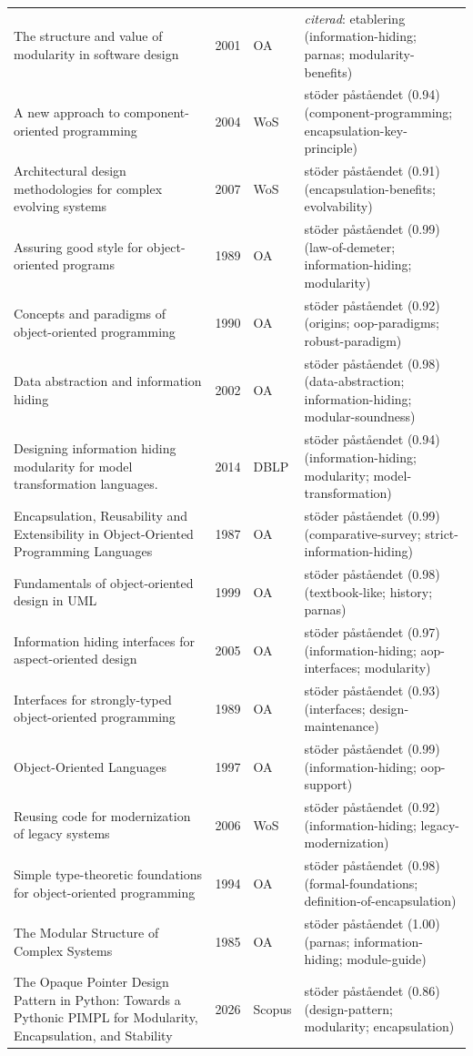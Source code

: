\begin{longtable}{@{}%
  >{\raggedright\arraybackslash}p{}c%
  >{\raggedright\arraybackslash}p{}%
  >{\raggedright\arraybackslash}p{}@{}}
The structure and value of modularity in software design & 2001 & OA & \emph{citerad}: etablering (information-hiding; parnas; modularity-benefits) \\
A new approach to component-oriented programming & 2004 & WoS & stöder påståendet (0.94) (component-programming; encapsulation-key-principle) \\
Architectural design methodologies for complex evolving systems & 2007 & WoS & stöder påståendet (0.91) (encapsulation-benefits; evolvability) \\
Assuring good style for object-oriented programs & 1989 & OA & stöder påståendet (0.99) (law-of-demeter; information-hiding; modularity) \\
Concepts and paradigms of object-oriented programming & 1990 & OA & stöder påståendet (0.92) (origins; oop-paradigms; robust-paradigm) \\
Data abstraction and information hiding & 2002 & OA & stöder påståendet (0.98) (data-abstraction; information-hiding; modular-soundness) \\
Designing information hiding modularity for model transformation languages. & 2014 & DBLP & stöder påståendet (0.94) (information-hiding; modularity; model-transformation) \\
Encapsulation, Reusability and Extensibility in Object-Oriented Programming Languages & 1987 & OA & stöder påståendet (0.99) (comparative-survey; strict-information-hiding) \\
Fundamentals of object-oriented design in UML & 1999 & OA & stöder påståendet (0.98) (textbook-like; history; parnas) \\
Information hiding interfaces for aspect-oriented design & 2005 & OA & stöder påståendet (0.97) (information-hiding; aop-interfaces; modularity) \\
Interfaces for strongly-typed object-oriented programming & 1989 & OA & stöder påståendet (0.93) (interfaces; design-maintenance) \\
Object-Oriented Languages & 1997 & OA & stöder påståendet (0.99) (information-hiding; oop-support) \\
Reusing code for modernization of legacy systems & 2006 & WoS & stöder påståendet (0.92) (information-hiding; legacy-modernization) \\
Simple type-theoretic foundations for object-oriented programming & 1994 & OA & stöder påståendet (0.98) (formal-foundations; definition-of-encapsulation) \\
The Modular Structure of Complex Systems & 1985 & OA & stöder påståendet (1.00) (parnas; information-hiding; module-guide) \\
The Opaque Pointer Design Pattern in Python: Towards a Pythonic PIMPL for Modularity, Encapsulation, and Stability & 2026 & Scopus & stöder påståendet (0.86) (design-pattern; modularity; encapsulation) \\
\end{longtable}
\endgroup
